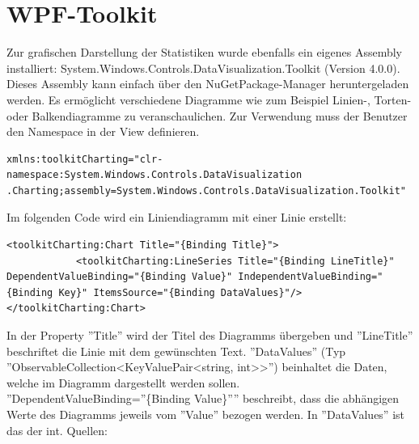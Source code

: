 \section{WPF-Toolkit}
Zur grafischen Darstellung der Statistiken wurde ebenfalls ein eigenes Assembly installiert:  System.Windows.Controls.DataVisualization.Toolkit (Version 4.0.0). Dieses Assembly kann einfach über den NuGetPackage-Manager heruntergeladen werden. Es ermöglicht verschiedene Diagramme wie zum Beispiel Linien-, Torten- oder Balkendiagramme zu veranschaulichen. Zur Verwendung muss der Benutzer den Namespace in der View definieren.
\begin{lstlisting}
xmlns:toolkitCharting="clr-namespace:System.Windows.Controls.DataVisualization
.Charting;assembly=System.Windows.Controls.DataVisualization.Toolkit"
\end{lstlisting}
Im folgenden Code wird ein Liniendiagramm mit einer Linie erstellt:
\begin{lstlisting}
<toolkitCharting:Chart Title="{Binding Title}">
            <toolkitCharting:LineSeries Title="{Binding LineTitle}"  DependentValueBinding="{Binding Value}" IndependentValueBinding="{Binding Key}" ItemsSource="{Binding DataValues}"/>
</toolkitCharting:Chart>
\end{lstlisting}
In der Property ''Title'' wird der Titel des Diagramms übergeben und ''LineTitle'' beschriftet die Linie mit dem gewünschten Text. ''DataValues'' (Typ ''ObservableCollection\textless KeyValuePair\textless string, int\textgreater \textgreater'') beinhaltet die Daten, welche im Diagramm dargestellt werden sollen. ''DependentValueBinding=''\{Binding Value\}'''' beschreibt, dass die abhängigen Werte des Diagramms jeweils vom ''Value'' bezogen werden. In ''DataValues'' ist das der int. \newline
Quellen: \cite{c-sharpcorner_charting_2017}
